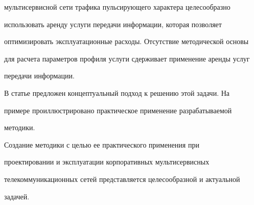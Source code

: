 мультисервисной сети трафика пульсирующего характера целесообразно 


использовать аренду услуги передачи информации, которая позволяет  


оптимизировать эксплуатационные расходы. Отсутствие методической основы 


для расчета параметров профиля услуги сдерживает применение аренды услуг 


передачи информации.


     


     В статье предложен концептуальный подход к решению этой задачи. На 


примере проиллюстрировано практическое применение разрабатываемой 


методики. 


      


      Создание методики с целью ее практического применения при 


проектировании и эксплуатации корпоративных мультисервисных 


телекоммуникационных сетей представляется целесообразной и актуальной 


задачей.


      


